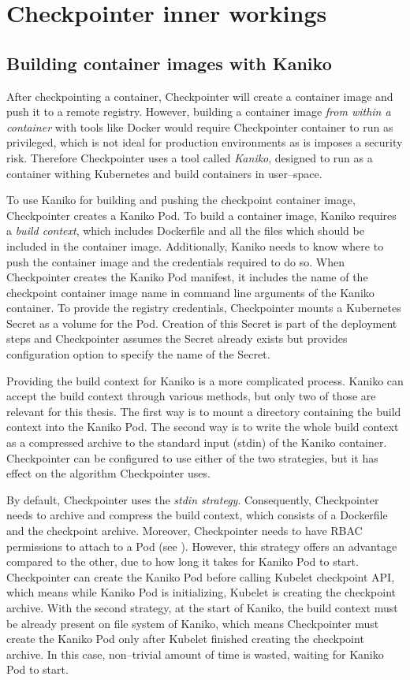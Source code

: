 \documentclass[
  digital,     %
  oneside,     %
  nosansbold,  %
  nocolorbold, %
  lof,         %
  lot,         %
]{fithesis4}
\begin{document}
\section{Checkpointer inner workings}



\subsection{Building container images with Kaniko}
After checkpointing a container, Checkpointer will create a container image and push it to a remote registry. However, building a container image \emph{from within a container} with tools like Docker would require Checkpointer container to run as privileged, which is not ideal for production environments as is imposes a security risk. Therefore Checkpointer uses a tool called \emph{Kaniko}, designed to run as a container withing Kubernetes and build containers in user--space.

To use Kaniko for building and pushing the checkpoint container image, Checkpointer creates a Kaniko Pod. To build a container image, Kaniko requires a \emph{build context}, which includes Dockerfile and all the files which should be included in the container image. Additionally, Kaniko needs to know where to push the container image and the credentials required to do so. When Checkpointer creates the Kaniko Pod manifest, it includes the name of the checkpoint container image name in command line arguments of the Kaniko container. To provide the registry credentials, Checkpointer mounts a Kubernetes Secret as a volume for the Pod. Creation of this Secret is part of the deployment steps and Checkpointer assumes the Secret already exists but provides configuration option to specify the name of the Secret.

Providing the build context for Kaniko is a more complicated process. Kaniko can accept the build context through various methods, but only two of those are relevant for this thesis. The first way is to mount a directory containing the build context into the Kaniko Pod. The second way is to write the whole build context as a compressed archive to the standard input (stdin) of the Kaniko container. Checkpointer can be configured to use either of the two strategies, but it has effect on the algorithm Checkpointer uses.

By default, Checkpointer uses the \emph{stdin strategy}. Consequently, Checkpointer needs to archive and compress the build context, which consists of a Dockerfile and the checkpoint archive. Moreover, Checkpointer needs to have RBAC permissions to attach to a Pod (see ). However, this strategy offers an advantage compared to the other, due to how long it takes for Kaniko Pod to start. Checkpointer can create the Kaniko Pod before calling Kubelet checkpoint API, which means while Kaniko Pod is initializing, Kubelet is creating the checkpoint archive. With the second strategy, at the start of Kaniko, the build context must be already present on file system of Kaniko, which means Checkpointer must create the Kaniko Pod only after Kubelet finished creating the checkpoint archive. In this case, non--trivial amount of time is wasted, waiting for Kaniko Pod to start.
\end{document}
